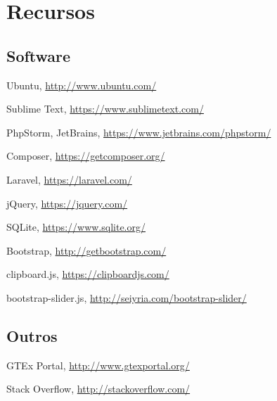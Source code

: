 \section{Recursos}


\subsection{Software}

\begin{description}

\item Ubuntu, \url{http://www.ubuntu.com/}

\item Sublime Text, \url{https://www.sublimetext.com/}

\item PhpStorm, JetBrains, \url{https://www.jetbrains.com/phpstorm/}

\item Composer, \url{https://getcomposer.org/}

\item Laravel, \url{https://laravel.com/}

\item jQuery, \url{https://jquery.com/}

\item SQLite, \url{https://www.sqlite.org/}

\item Bootstrap, \url{http://getbootstrap.com/}

\item clipboard.js, \url{https://clipboardjs.com/}

\item bootstrap-slider.js, \url{http://seiyria.com/bootstrap-slider/}

\end{description}


\subsection{Outros}

\begin{description}

\item GTEx Portal, \url{http://www.gtexportal.org/}

\item Stack Overflow, \url{http://stackoverflow.com/}

\end{description}

\newpage
